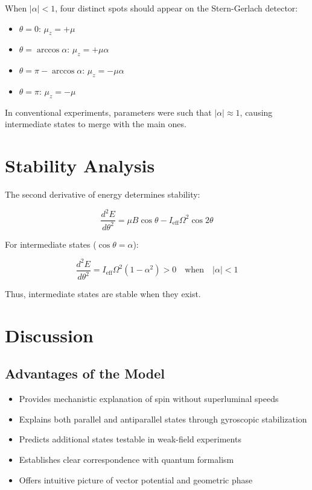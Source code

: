 \documentclass[12pt]{article}
\begin{document}
When $|\alpha| < 1$, four distinct spots should appear on the Stern-Gerlach detector:

\begin{itemize}
\item $\theta = 0$: $\mu_z = +\mu$
\item $\theta = \arccos\alpha$: $\mu_z = +\mu\alpha$
\item $\theta = \pi - \arccos\alpha$: $\mu_z = -\mu\alpha$
\item $\theta = \pi$: $\mu_z = -\mu$
\end{itemize}

In conventional experiments, parameters were such that $|\alpha| \approx 1$, causing intermediate states to merge with the main ones.

\section{Stability Analysis}

The second derivative of energy determines stability:

\begin{equation}
\frac{d^2E}{d\theta^2} = \mu B \cos\theta - I_{\text{eff}}\Omega^2 \cos 2\theta
\end{equation}

For intermediate states ($\cos\theta = \alpha$):

\begin{equation}
\frac{d^2E}{d\theta^2} = I_{\text{eff}}\Omega^2 (1 - \alpha^2) > 0 \quad \text{when} \quad |\alpha| < 1
\end{equation}

Thus, intermediate states are stable when they exist.

\section{Discussion}

\subsection{Advantages of the Model}

\begin{itemize}
\item Provides mechanistic explanation of spin without superluminal speeds
\item Explains both parallel and antiparallel states through gyroscopic stabilization
\item Predicts additional states testable in weak-field experiments
\item Establishes clear correspondence with quantum formalism
\item Offers intuitive picture of vector potential and geometric phase
\end{itemize}
\end{document}
